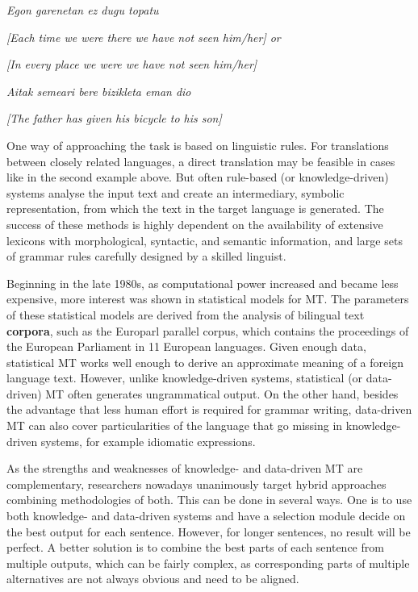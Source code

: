 \begin{multicols}{2}
\textit{Egon garenetan ez dugu topatu}

\textit{[Each time we were there we have not seen him/her] or }

\textit{[In every place we were we have not seen him/her]}

\textit{Aitak semeari bere bizikleta eman dio}

\textit{[The father has given his bicycle to his son]}

One way of approaching the task is based on linguistic rules. For translations between closely related languages, a direct translation may be feasible in cases like in the second example above. But often rule-based (or knowledge-driven) systems analyse the input text and create an intermediary, symbolic representation, from which the text in the target language is generated. The success of these methods is highly dependent on the availability of extensive lexicons with morphological, syntactic, and semantic information, and large sets of grammar rules carefully designed by a skilled linguist.

Beginning in the late 1980s, as computational power increased and became less expensive, more interest was shown in statistical models for MT. The parameters of these statistical models are derived from the analysis of bilingual text \textbf{corpora}, such as the Europarl parallel corpus, which contains the proceedings of the European Parliament in 11 European languages. Given enough data, statistical MT works well enough to derive an approximate meaning of a foreign language text. However, unlike knowledge-driven systems, statistical (or data-driven) MT often generates ungrammatical output. On the other hand, besides the advantage that less human effort is required for grammar writing, data-driven MT can also cover particularities of the language that go missing in knowledge-driven systems, for example idiomatic expressions. 

As the strengths and weaknesses of knowledge- and data-driven MT are complementary, researchers nowadays unanimously target hybrid approaches combining methodologies of both. This can be done in several ways. One is to use both knowledge- and data-driven systems and have a selection module decide on the best output for each sentence. However, for longer sentences, no result will be perfect. A better solution is to combine the best parts of each sentence from multiple outputs, which can be fairly complex, as corresponding parts of multiple alternatives are not always obvious and need to be aligned. 


\end{multicols}
